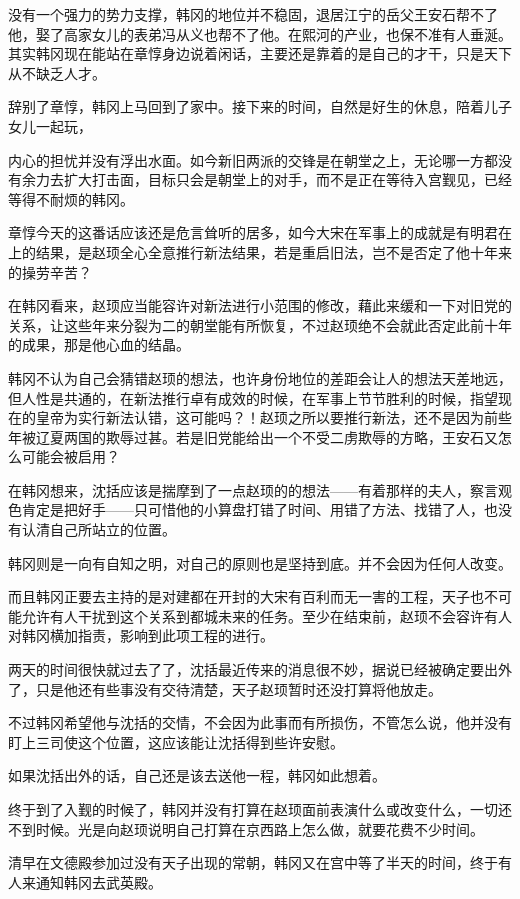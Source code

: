 没有一个强力的势力支撑，韩冈的地位并不稳固，退居江宁的岳父王安石帮不了他，娶了高家女儿的表弟冯从义也帮不了他。在熙河的产业，也保不准有人垂涎。其实韩冈现在能站在章惇身边说着闲话，主要还是靠着的是自己的才干，只是天下从不缺乏人才。

辞别了章惇，韩冈上马回到了家中。接下来的时间，自然是好生的休息，陪着儿子女儿一起玩，

内心的担忧并没有浮出水面。如今新旧两派的交锋是在朝堂之上，无论哪一方都没有余力去扩大打击面，目标只会是朝堂上的对手，而不是正在等待入宫觐见，已经等得不耐烦的韩冈。

章惇今天的这番话应该还是危言耸听的居多，如今大宋在军事上的成就是有明君在上的结果，是赵顼全心全意推行新法结果，若是重启旧法，岂不是否定了他十年来的操劳辛苦？

在韩冈看来，赵顼应当能容许对新法进行小范围的修改，藉此来缓和一下对旧党的关系，让这些年来分裂为二的朝堂能有所恢复，不过赵顼绝不会就此否定此前十年的成果，那是他心血的结晶。

韩冈不认为自己会猜错赵顼的想法，也许身份地位的差距会让人的想法天差地远，但人性是共通的，在新法推行卓有成效的时候，在军事上节节胜利的时候，指望现在的皇帝为实行新法认错，这可能吗？！赵顼之所以要推行新法，还不是因为前些年被辽夏两国的欺辱过甚。若是旧党能给出一个不受二虏欺辱的方略，王安石又怎么可能会被启用？

在韩冈想来，沈括应该是揣摩到了一点赵顼的的想法——有着那样的夫人，察言观色肯定是把好手——只可惜他的小算盘打错了时间、用错了方法、找错了人，也没有认清自己所站立的位置。

韩冈则是一向有自知之明，对自己的原则也是坚持到底。并不会因为任何人改变。

而且韩冈正要去主持的是对建都在开封的大宋有百利而无一害的工程，天子也不可能允许有人干扰到这个关系到都城未来的任务。至少在结束前，赵顼不会容许有人对韩冈横加指责，影响到此项工程的进行。

两天的时间很快就过去了了，沈括最近传来的消息很不妙，据说已经被确定要出外了，只是他还有些事没有交待清楚，天子赵顼暂时还没打算将他放走。

不过韩冈希望他与沈括的交情，不会因为此事而有所损伤，不管怎么说，他并没有盯上三司使这个位置，这应该能让沈括得到些许安慰。

如果沈括出外的话，自己还是该去送他一程，韩冈如此想着。

终于到了入觐的时候了，韩冈并没有打算在赵顼面前表演什么或改变什么，一切还不到时候。光是向赵顼说明自己打算在京西路上怎么做，就要花费不少时间。

清早在文德殿参加过没有天子出现的常朝，韩冈又在宫中等了半天的时间，终于有人来通知韩冈去武英殿。

